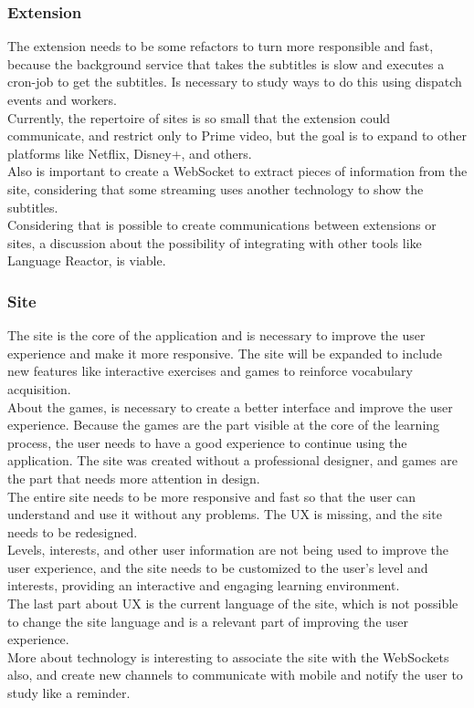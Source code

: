 \documentclass[12pt]{article}
\begin{document}
\subsubsection{Extension}
The extension needs to be some refactors to turn more responsible and fast, because the background service that takes the subtitles is slow and executes a cron-job to get the subtitles. Is necessary to study ways to do this using dispatch events and workers. \\
Currently, the repertoire of sites is so small that the extension could communicate, and restrict only to Prime video, but the goal is to expand to other platforms like Netflix, Disney+, and others. \\
Also is important to create a WebSocket to extract pieces of information from the site, considering that some streaming uses another technology to show the subtitles. \\
Considering that is possible to create communications between extensions or sites, a discussion about the possibility of integrating with other tools like Language Reactor, is viable.


\subsubsection{Site}
The site is the core of the application and is necessary to improve the user experience and make it more responsive. The site will be expanded to include new features like interactive exercises and games to reinforce vocabulary acquisition. \\
About the games, is necessary to create a better interface and improve the user experience. Because the games are the part visible at the core of the learning process, the user needs to have a good experience to continue using the application. The site was created without a professional designer, and games are the part that needs more attention in design. \\
The entire site needs to be more responsive and fast so that the user can understand and use it without any problems. The UX is missing, and the site needs to be redesigned. \\
Levels, interests, and other user information are not being used to improve the user experience, and the site needs to be customized to the user's level and interests, providing an interactive and engaging learning environment. \\
The last part about UX is the current language of the site, which is not possible to change the site language and is a relevant part of improving the user experience. \\
More about technology is interesting to associate the site with the WebSockets also, and create new channels to communicate with mobile and notify the user to study like a reminder. 
\end{document}
